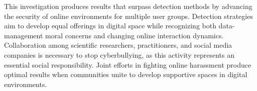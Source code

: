 This investigation produces results that surpass detection methods by advancing the security of online environments for multiple user groups. Detection strategies aim to develop equal offerings in digital space while recognizing both data-management moral concerns and changing online interaction dynamics. Collaboration among scientific researchers, practitioners, and social media companies is necessary to stop cyberbullying, as this activity represents an essential social responsibility. Joint efforts in fighting online harassment produce optimal results when communities unite to develop supportive spaces in digital environments.